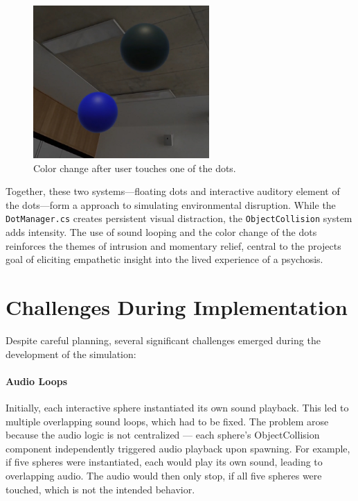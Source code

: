\begin{figure}[H]
    \centering
    \includegraphics[width=0.6\textwidth]{../../Figures/dots-after-touch.jpg}
    \caption{Color change after user touches one of the dots.}
    \label{fig:dots_after}
\end{figure}


Together, these two systems—floating dots and interactive auditory element of the dots—form a approach to simulating environmental disruption. While the \texttt{DotManager.cs} creates persistent visual distraction, the \texttt{ObjectCollision} system adds intensity. The use of sound looping and the color change of the dots reinforces the themes of intrusion and momentary relief, central to the projects goal of eliciting empathetic insight into the lived experience of a psychosis.


\section{Challenges During Implementation} 
Despite careful planning, several significant challenges emerged during the development of the simulation:

\paragraph{Audio Loops} 
Initially, each interactive sphere instantiated its own sound playback. This led to multiple overlapping sound loops, which had to be fixed. The problem arose because the audio logic is not centralized — each sphere's ObjectCollision component independently triggered audio playback upon spawning. For example, if five spheres were instantiated, each would play its own sound, leading to overlapping audio. The audio would then only stop, if all five spheres were touched, which is not the intended behavior.

